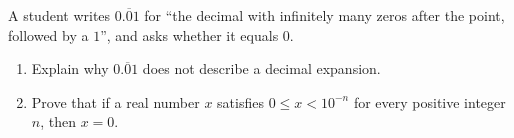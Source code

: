 A student writes $0.\overline{0}1$ for ``the decimal with infinitely many zeros after the point, followed by a $1$'', and asks whether it equals $0$.
\begin{enumerate}
\item[(a)] Explain why $0.\overline{0}1$ does not describe a decimal expansion.
\item[(b)] Prove that if a real number $x$ satisfies $0\le x<10^{-n}$ for every positive integer $n$, then $x=0$.
\end{enumerate}

